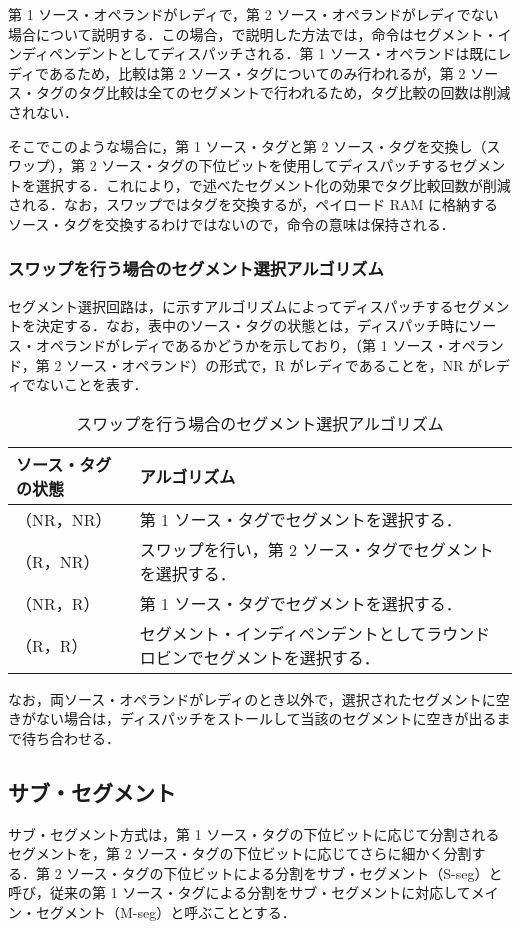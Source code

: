 第 1 ソース・オペランドがレディで，第 2 ソース・オペランドがレディでない場合について説明する．この場合，で説明した方法では，命令はセグメント・インディペンデントとしてディスパッチされる．第 1 ソース・オペランドは既にレディであるため，比較は第 2 ソース・タグについてのみ行われるが，第 2  ソース・タグのタグ比較は全てのセグメントで行われるため，タグ比較の回数は削減されない．

そこでこのような場合に，第 1 ソース・タグと第 2 ソース・タグを交換し（スワップ），第 2 ソース・タグの下位ビットを使用してディスパッチするセグメントを選択する．これにより，で述べたセグメント化の効果でタグ比較回数が削減される．なお，スワップではタグを交換するが，ペイロード RAM に格納するソース・タグを交換するわけではないので，命令の意味は保持される．

\subsubsection{スワップを行う場合のセグメント選択アルゴリズム}
セグメント選択回路は，に示すアルゴリズムによってディスパッチするセグメントを決定する．なお，表中のソース・タグの状態とは，ディスパッチ時にソース・オペランドがレディであるかどうかを示しており，（第 1 ソース・オペランド，第 2 ソース・オペランド）の形式で，R がレディであることを，NR がレディでないことを表す．

\begin{table}[htb]
  \caption{スワップを行う場合のセグメント選択アルゴリズム}
  \footnotesize
  \center
   \begin{tabular}{|l|l|} \hline \hline
    ソース・タグの状態 & アルゴリズム \\ \hline
    （NR，NR） & 第 1 ソース・タグでセグメントを選択する． \\ \hline
    （R，NR） & スワップを行い，第 2 ソース・タグでセグメントを選択する．\\ \hline
    （NR，R） & 第 1 ソース・タグでセグメントを選択する．\\ \hline
    （R，R） & セグメント・インディペンデントとしてラウンドロビンでセグメントを選択する． \\ \hline
  \end{tabular}
  \label{tab:agg_algorithm}
\end{table}
なお，両ソース・オペランドがレディのとき以外で，選択されたセグメントに空きがない場合は，ディスパッチをストールして当該のセグメントに空きが出るまで待ち合わせる．

\subsection{サブ・セグメント}
\label{sec:sub_segment}
サブ・セグメント方式は，第 1 ソース・タグの下位ビットに応じて分割されるセグメントを，第 2 ソース・タグの下位ビットに応じてさらに細かく分割する．第 2 ソース・タグの下位ビットによる分割をサブ・セグメント（S-seg）と呼び，従来の第 1 ソース・タグによる分割をサブ・セグメントに対応してメイン・セグメント（M-seg）と呼ぶこととする．

